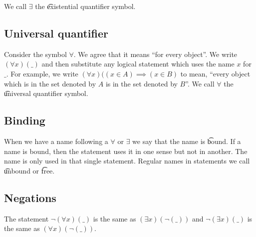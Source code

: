 We call $\exists $ the \t{existential quantifier} symbol.

\subsection*{Universal quantifier}

Consider the symbol $\forall$.
We agree that it means ``for every object''.
We write $(\forall x)(\_)$ and then substitute any logical statement which uses the name $x$ for $\_$.
For example, we write $(\forall x)((x \in A)\implies(x \in B)$ to mean, ``every object which is in the set denoted by $A$ is in the set denoted by $B$''.
We call $\forall$ the \t{universal quantifier} symbol.

\subsection*{Binding}

When we have a name following a $\forall$ or $\exists $ we say that the name is \t{bound}.
If a name is bound, then the statement uses it in one sense but not in another.
The name is only used in that single statement.
Regular names in statements we call \t{unbound} or \t{free}.

\subsection*{Negations}

The statement $\neg(\forall x)(\_)$ is the same as $(\exists x)(\neg(\_))$ and $\neg(\exists x)(\_)$ is the same as $(\forall x)(\neg(\_))$.
